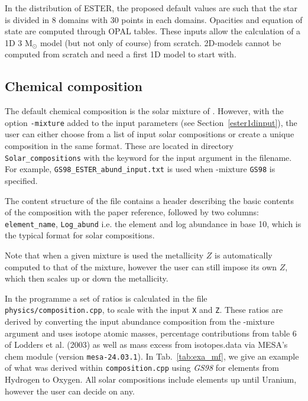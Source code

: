 In the distribution of ESTER, the proposed default values are such that
the star is divided in 8 domains with 30 points in each domains. Opacities
and equation of state are computed through OPAL tables. These inputs
allow the calculation of a 1D 3 M$_\odot$ model (but not only of course)
from scratch. 2D-models cannot be computed from scratch and need a first
1D model to start with.

\subsection{Chemical composition}

The default chemical composition is the solar mixture of
\cite{GN93}. {However, with the option {\tt -mixture} added to the
input parameters (see Section~\ref{ester1dinput}), the user can
either choose from a list of input solar compositions or create a
unique composition in the same format. These are located in directory
\texttt{Solar\_compositions} with the keyword for the input argument
in the filename. For example, \texttt{GS98\_ESTER\_abund\_input.txt}
is used when -mixture {\tt GS98} is specified.}

The content structure of the file contains a header describing the basic
contents of the composition with the paper reference, followed by two
columns: {\tt element\_name}, {\tt Log\_abund} i.e. the element and log
abundance in base 10, which is the typical format for solar compositions.

Note that when a given mixture is used the metallicity $Z$ is automatically
computed to that of the mixture, however the user can still impose its own $Z$,
which then scales up or down the metallicity.

In the programme a set of ratios is calculated in the file {\tt
physics/composition.cpp}, to scale with the input {\tt X} and
{\tt Z}. These ratios are derived by converting the input abundance
composition from the {-mixture} argument and uses isotope atomic masses,
percentage contributions from table 6 of Lodders et al. (2003) as
well as mass excess from isotopes.data via MESA's chem module (version
\texttt{mesa-24.03.1}). In Tab.~\ref{tab:exa_mf}, we give an example of
what was derived within \texttt{composition.cpp} using \textit{GS98}
for elements from Hydrogen to Oxygen. All solar compositions include
elements up until Uranium, however the user can decide on any.


